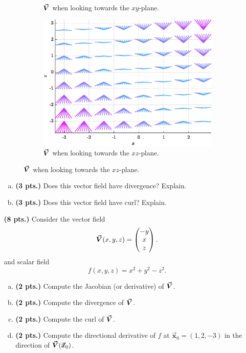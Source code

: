 \documentclass[12pt]{article} %
\newcommand{\vecx}{\boldsymbol{\vec{x}}}
\begin{document}
\begin{problem}
\begin{figure}[H]
\begin{subfigure}[b]{0.45\textwidth}
        \caption{$\boldsymbol{\vec{V}}$ when looking towards the $xy$-plane.}
    \end{subfigure}
    \quad
    \begin{subfigure}[b]{0.45\textwidth}
        \centering
        \includegraphics[width=\textwidth]{figures/vecfield_xz}
        \caption{$\boldsymbol{\vec{V}}$ when looking towards the $xz$-plane.}
    \end{subfigure}
\end{figure}
\begin{enumerate}[(a)]
    \item \textbf{(3 pts.)} Does this vector field have divergence? Explain.
    \item \textbf{(3 pts.)} Does this vector field have curl? Explain.
\end{enumerate}
\end{problem}

\vspace*{0.5cm}

\begin{problem}
\textbf{(8 pts.)} Consider the vector field
\[
\boldsymbol{\vec{V}}(x,y,z) = \begin{pmatrix} -y \\ x \\ z \end{pmatrix}.
\]
and scalar field
\[
f(x,y,z) = x^2+y^2-z^2.
\]
\begin{enumerate}[(a)]
    \item \textbf{(2 pts.)} Compute the Jacobian (or derivative) of $\boldsymbol{\vec{V}}$.
    \item \textbf{(2 pts.)} Compute the divergence of $\boldsymbol{\vec{V}}$.
    \item \textbf{(2 pts.)} Compute the curl of $\boldsymbol{\vec{V}}$.
    \item \textbf{(2 pts.)} Compute the directional derivative of $f$ at $\vecx_0 = (1,2,-3)$ in the direction of $\vecfieldV(\vecx_0)$.
\end{enumerate}
\end{problem}
\end{document}
